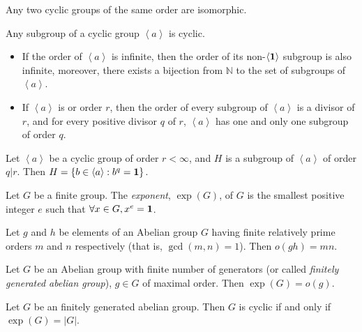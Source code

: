 \begin{theorem}
Any two cyclic groups of the same order are isomorphic.
\end{theorem}

\begin{theorem}
Any subgroup of a cyclic group $\left<a \right>$ is cyclic.
\begin{itemize}
    \item If the order of $\left<a \right>$ is infinite, then the order of its non-$\left<\mathbf{1} \right>$ subgroup is also infinite, moreover, there exists a bijection from $\mathbb{N}$ to the set of subgroups of $\left<a \right>$.
    \item If $\left<a \right>$ is or order $r$, then the order of every subgroup of $\left<a \right>$ is a divisor of $r$, and for every positive divisor $q$ of $r$, $\left<a \right>$ has one and only one subgroup of order $q$.
\end{itemize}
\end{theorem}

\begin{corollary}
Let $\left<a \right>$ be a cyclic group of order $r < \infty$, and $H$ is a subgroup of $\left<a \right>$ of order $q|r$. Then $H = \{ b \in \left<a \right> : b^{q}=\mathbf{1} \}$.
\end{corollary}

\begin{definition}[Exponent]
Let $G$ be a finite group. The \textit{exponent}, $\exp(G)$, of $G$ is the smallest positive integer $e$ such that $\forall x \in G, x^{e}=\mathbf{1}$.
\end{definition}

\begin{lemma}
Let $g$ and $h$ be elements of an Abelian group $G$ having finite relatively prime orders $m$ and $n$ respectively (that is, $\operatorname{gcd}(m,n) = 1$). Then $o(gh) = mn$.
\end{lemma}

\begin{lemma}
Let $G$ be an Abelian group with finite number of generators (or called \textit{finitely generated abelian group}), $g \in G$ of maximal order. Then $\exp(G) = o(g)$.
\end{lemma}



\begin{theorem}
Let $G$ be an finitely generated abelian group. Then $G$ is cyclic if and only if $\exp(G) = |G|$.
\end{theorem}


